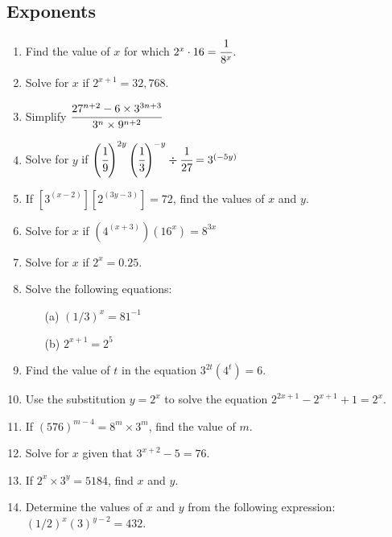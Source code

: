 	\subsection{Exponents}
\begin{enumerate}
	
	\item Find the value of $x$ for which $2^x \cdot 16 = \cfrac{1}{8^x}$.
	
	\item Solve for $x$ if $2^{x + 1} = 32,768$.
	
	\item Simplify $\cfrac{27^{n + 2} - 6 \times 3^{3n + 3}}{3^n \times 9^{n + 2}}$
	
	\item Solve for $y$ if $\left(\cfrac{1}{9}\right)^{2y} \left(\cfrac{1}{3}\right)^{-y}\div \cfrac{1}{27} = 3^{(-5y)}$
	
	\item If $\left[3^{(x-2)}\right] \left[2^{(3y - 3)}\right] = 72$, find the values of $x$ and $y$.
	
	\item Solve for $x$ if $\left(4^{(x + 3)}\right)\left(16^x\right) = 8^{3x}$

	\item Solve for $x$ if $2^x = 0.25$.
	
	\item Solve the following equations:
		\begin{itemize}
		\item[(a)] $\left(1/3\right)^x = 81^{-1}$
		\item[(b)] $2^{x + 1} = 2^5$
		\end{itemize}
		
	\item Find the value of $t$ in the equation $3^{2t}\left(4^t\right) = 6$.
	
	\item Use the substitution $y = 2^x$ to solve the equation $2^{2x + 1} - 2^{x + 1} + 1 = 2^x$.
	
	\item If $(576)^{m - 4} = 8^m \times 3^m$, find the value of $m$.
	
	\item Solve for $x$ given that $3^{x + 2} - 5 = 76$.
	
	\item If $2^x \times 3^y = 5184$, find $x$ and $y$.
	
	\item Determine the values of $x$ and $y$ from the following expression: $\left(1/2\right)^x(3)^{y - 2} = 432$.
	

\end{enumerate}
